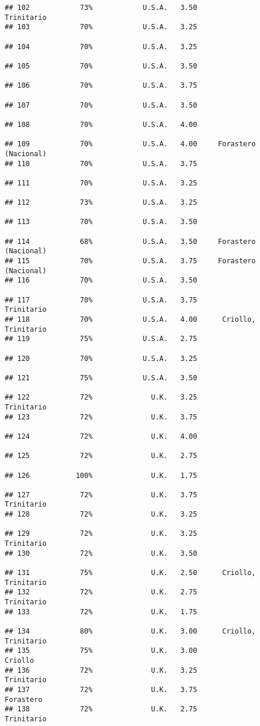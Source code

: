 \documentclass[
]{article}
\begin{document}
\begin{verbatim}
## 102            73%            U.S.A.   3.50               Trinitario
## 103            70%            U.S.A.   3.25                         
## 104            70%            U.S.A.   3.25                         
## 105            70%            U.S.A.   3.50                         
## 106            70%            U.S.A.   3.75                         
## 107            70%            U.S.A.   3.50                         
## 108            70%            U.S.A.   4.00                         
## 109            70%            U.S.A.   4.00     Forastero (Nacional)
## 110            70%            U.S.A.   3.75                         
## 111            70%            U.S.A.   3.25                         
## 112            73%            U.S.A.   3.25                         
## 113            70%            U.S.A.   3.50                         
## 114            68%            U.S.A.   3.50     Forastero (Nacional)
## 115            70%            U.S.A.   3.75     Forastero (Nacional)
## 116            70%            U.S.A.   3.50                         
## 117            70%            U.S.A.   3.75               Trinitario
## 118            70%            U.S.A.   4.00      Criollo, Trinitario
## 119            75%            U.S.A.   2.75                         
## 120            70%            U.S.A.   3.25                         
## 121            75%            U.S.A.   3.50                         
## 122            72%              U.K.   3.25               Trinitario
## 123            72%              U.K.   3.75                         
## 124            72%              U.K.   4.00                         
## 125            72%              U.K.   2.75                         
## 126           100%              U.K.   1.75                         
## 127            72%              U.K.   3.75               Trinitario
## 128            72%              U.K.   3.25                         
## 129            72%              U.K.   3.25               Trinitario
## 130            72%              U.K.   3.50                         
## 131            75%              U.K.   2.50      Criollo, Trinitario
## 132            72%              U.K.   2.75               Trinitario
## 133            72%              U.K.   1.75                         
## 134            80%              U.K.   3.00      Criollo, Trinitario
## 135            75%              U.K.   3.00                  Criollo
## 136            72%              U.K.   3.25               Trinitario
## 137            72%              U.K.   3.75                Forastero
## 138            72%              U.K.   2.75               Trinitario

\end{verbatim}
\end{document}
